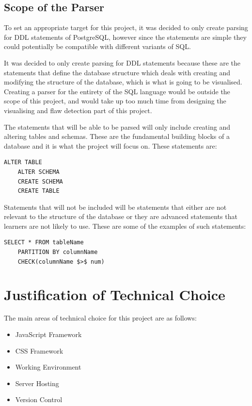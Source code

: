 \subsection{Scope of the Parser}

To set an appropriate target for this project, it was decided to only create parsing for DDL statements of PostgreSQL, however since the statements are simple they could potentially be compatible with different variants of SQL. 

It was decided to only create parsing for DDL statements because these are the statements that define the database structure which deals with creating and modifying the structure of the database, which is what is going to be visualised. Creating a parser for the entirety of the SQL language would be outside the scope of this project, and would take up too much time from designing the visualising and flaw detection part of this project.

The statements that will be able to be parsed will only include creating and altering tables and schemas. These are the fundamental building blocks of a database and it is what the project will focus on. These statements are:

\begin{lstlisting}[style=JavaScript, caption={}]
	ALTER TABLE
	ALTER SCHEMA
	CREATE SCHEMA
	CREATE TABLE
\end{lstlisting}

Statements that will not be included will be statements that either are not relevant to the structure of the database or they are advanced statements that learners are not likely to use. These are some of the examples of such statements:

\begin{lstlisting}[style=JavaScript, caption={}]
	SELECT * FROM tableName
	PARTITION BY columnName
	CHECK(columnName $>$ num)
\end{lstlisting}

\newpage

\section{Justification of Technical Choice}

The main areas of technical choice for this project are as follows:

\begin{itemize}
	\item JavaScript Framework
	\item CSS Framework
	\item Working Environment
	\item Server Hosting
	\item Version Control
\end{itemize}

